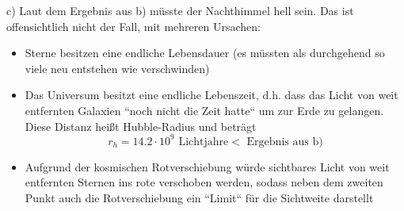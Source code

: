 \documentclass[11pt, a4paper]{article}
\begin{document}
\vspace{0.5cm}

c) Laut dem Ergebnis aus b) müsste der Nachthimmel hell sein. Das ist
offensichtlich nicht der Fall, mit mehreren Ursachen:
\begin{itemize}
	\item Sterne besitzen eine endliche Lebensdauer (es müssten als durchgehend so viele neu 
	entstehen wie verschwinden)
	\item Das Universum besitzt eine endliche Lebenszeit, d.h. dass das Licht von weit entfernten Galaxien 
	``noch nicht die Zeit hatte`` um zur Erde zu gelangen.
	Diese Distanz heißt Hubble-Radius und beträgt 
	\[ r_h = 14.2 \cdot 10^9 \text{ Lichtjahre} < \text{ Ergebnis aus b)}\]
	\item Aufgrund der kosmischen Rotverschiebung würde sichtbares Licht von weit entfernten 
	Sternen ins rote verschoben werden, sodass neben dem zweiten Punkt auch die Rotverschiebung ein 
	``Limit`` für die Sichtweite darstellt
	\end{itemize}
\end{document}
